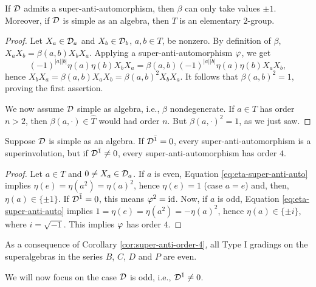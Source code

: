 \documentclass{amsbook}
\begin{document}
\begin{prop}
    If $\mathcal{D}$ admits a super-anti-automorphism, then $\beta$ can only take values $\pm 1$. Moreover, if $\mathcal{D}$ is simple as an algebra, then $T$ is an elementary $2$-group.
\end{prop}

\begin{proof}
    Let $X_a\in \mathcal{D}_a$ and $X_b\in \mathcal{D}_b$, $a,b\in T$, be nonzero. By definition of $\beta$, $X_a X_b = \beta(a,b) X_b X_a$. Applying a super-anti-automorphism $\varphi$, we get \[(-1)^{|a||b|} \eta(a) \eta(b) X_b X_a = \beta(a,b) (-1)^{|a||b|} \eta(a) \eta(b) X_a X_b,\] hence $X_b X_a = \beta(a,b) X_a X_b = \beta(a,b)^2 X_b X_a$. It follows that $\beta(a,b)^2 = 1$, proving the first assertion.
    
    We now assume $\mathcal{D}$ simple as algebra, i.e., $\beta$ nondegenerate. If $a\in T$ has order $n>2$, then $\beta(a, \cdot)\in \widehat T$ would had order $n$. But $\beta(a, \cdot )^2 =1$, as we just saw.
\end{proof}

\begin{cor}\label{cor:super-anti-order-4}
    Suppose $\mathcal{D}$ is simple as an algebra. If $\mathcal{D}^{\bar1} = 0$, every super-anti-automorphism is a superinvolution, but if $\mathcal{D}^{\bar1} \neq 0$, every super-anti-automorphism has order $4$.
\end{cor}

\begin{proof}
    Let $a\in T$ and $0 \neq X_a \in \mathcal{D}_a$. If $a$ is even, Equation \eqref{eq:eta-super-anti-auto} implies $\eta(e) = \eta (a^2) = \eta(a)^2$, hence $\eta(e) = 1$ (case $a=e$) and, then,  $\eta(a) \in \{ \pm 1 \}$. If $\mathcal{D}^{\bar1} = 0$, this means $\varphi^2 = \operatorname{id}$. Now, if $a$ is odd, Equation \eqref{eq:eta-super-anti-auto} implies $1 = \eta(e) = \eta (a^2) = - \eta(a)^2$, hence $\eta(a) \in \{ \pm i \}$, where $i = \sqrt{-1}$. This implies $\varphi$ has order $4$.
\end{proof}

As a consequence of Corollary \ref{cor:super-anti-order-4}, all Type I gradings on the superalgebras in the series $B$, $C$, $D$ and $P$ are even.

We will now focus on the case $\mathcal{D}$ is odd, i.e., $\mathcal{D}^{\bar1} \neq 0$.
\end{document}
